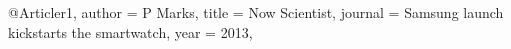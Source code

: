 @Article{r1,
author = {P Marks},
title = {Now Scientist},
journal = {Samsung launch kickstarts the smartwatch},
year = {2013},
}
